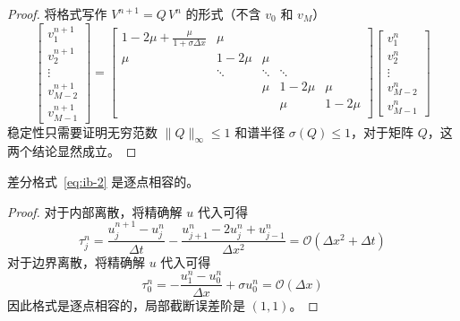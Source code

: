 \begin{proof}
    将格式写作 $V^{n+1} = Q\, V^n$ 的形式（不含 $v_0$ 和 $v_{M}$）
    \[
        \begin{bmatrix}
            v_1^{n+1} \\ v_2^{n+1} \\ \vdots \\ v_{M-2}^{n+1} \\ v_{M-1}^{n+1}
        \end{bmatrix}
        =
        \begin{bmatrix}
            1-2\mu + \frac{\mu}{1+\sigma \Delta x} & \mu    &        &        &        \\
            \mu                                    & 1-2\mu & \mu    &        &        \\
                                                   & \ddots & \ddots & \ddots &        \\
                                                   &        & \mu    & 1-2\mu & \mu    \\
                                                   &        &        & \mu    & 1-2\mu \\
        \end{bmatrix}
        \begin{bmatrix}
            v_1^{n} \\ v_2^{n} \\ \vdots \\ v_{M-2}^{n} \\ v_{M-1}^{n}
        \end{bmatrix}
    \]
    稳定性只需要证明无穷范数 $\|Q\|_{\infty} \le 1$
    和谱半径 $\sigma(Q) \le 1$，对于矩阵 $Q$，这两个结论显然成立。
\end{proof}

\begin{example}
    差分格式~\eqref{eq:ib-2} 是逐点相容的。
\end{example}

\begin{proof}
    对于内部离散，将精确解 $u$ 代入可得
    \[
        \tau_j^n = \frac{u_{j}^{n+1}-u_j^n}{\Delta t} - \frac{u_{j+1}^{n}-2u_{j}^{n}+u_{j-1}^{n}}{\Delta x^2}
        = \mathcal{O}(\Delta x^2 + \Delta t)
    \]
    对于边界离散，将精确解 $u$ 代入可得
    \[
        \tau_0^n = - \frac{u_1^n - u_0^n}{\Delta x} + \sigma u_0^n = \mathcal{O}(\Delta x)
    \]
    因此格式是逐点相容的，局部截断误差阶是 $(1,1)$。
\end{proof}

